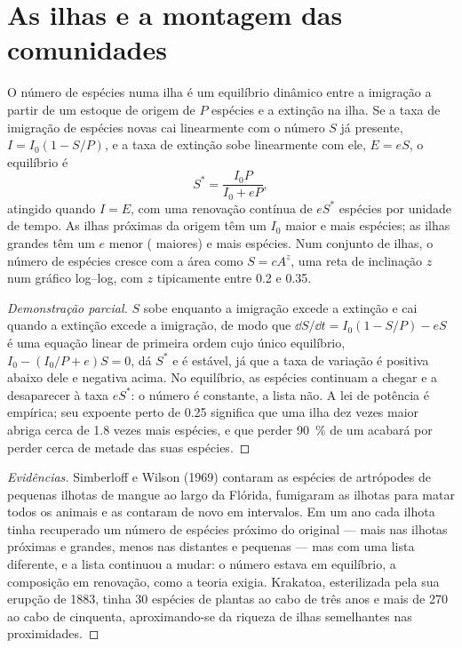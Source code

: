 \section{As ilhas e a montagem das comunidades}

\begin{theorem}\label{thm:b1:ecosystem-dynamics:island}
O número de espécies numa ilha é um equilíbrio dinâmico entre a
imigração a partir de um estoque de origem de $P$ espécies e a
extinção na ilha. Se a taxa de imigração de espécies novas cai
linearmente com o número $S$ já presente, $I = I_0(1 - S/P)$, e a taxa
de extinção sobe linearmente com ele, $E = eS$, o equilíbrio é
\[
S^* = \frac{I_0 P}{I_0 + eP} ,
\]
atingido quando $I = E$, com uma renovação contínua de $eS^*$ espécies
por unidade de tempo. As ilhas próximas da origem têm um $I_0$ maior e
mais espécies; as ilhas grandes têm um $e$ menor ( maiores)
e mais espécies. Num conjunto de ilhas, o número de espécies cresce
com a área como $S = cA^z$, uma reta de inclinação $z$ num gráfico
log--log, com $z$ tipicamente entre \num{0.2} e \num{0.35}.
\end{theorem}
\begin{proof}[Demonstração parcial]
$S$ sobe enquanto a imigração excede a extinção e cai quando a
extinção excede a imigração, de modo que $\dd S/\dd t = I_0(1 - S/P) - eS$
é uma equação linear de primeira ordem cujo único equilíbrio, $I_0 -
(I_0/P + e)S = 0$, dá $S^*$ e é estável, já que a taxa de variação é
positiva abaixo dele e negativa acima. No equilíbrio, as espécies
continuam a chegar e a desaparecer à taxa $eS^*$: o número é
constante, a lista não. A lei de potência é empírica; seu expoente
perto de \num{0.25} significa que uma ilha dez vezes maior abriga
cerca de \num{1.8} vezes mais espécies, e que perder \qty{90}{\%} de um
 acabará por perder cerca de metade das suas espécies.
\end{proof}
\begin{proof}[Evidências]
Simberloff e Wilson (1969) contaram as espécies de artrópodes de
pequenas ilhotas de mangue ao largo da Flórida, fumigaram as ilhotas
para matar todos os animais e as contaram de novo em intervalos. Em um
ano cada ilhota tinha recuperado um número de espécies próximo do
original --- mais nas ilhotas próximas e grandes, menos nas distantes
e pequenas --- mas com uma lista diferente, e a lista continuou a
mudar: o número estava em equilíbrio, a composição em renovação, como
a teoria exigia. Krakatoa, esterilizada pela sua erupção de 1883,
tinha \num{30} espécies de plantas ao cabo de três anos e mais de
\num{270} ao cabo de cinquenta, aproximando-se da riqueza de ilhas
semelhantes nas proximidades.
\end{proof}

